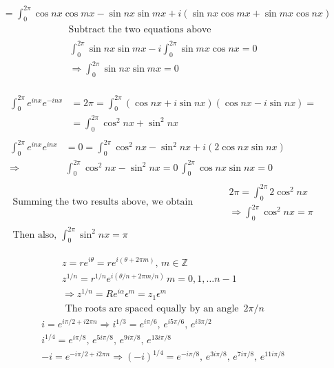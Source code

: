 \documentclass[twoside]{amsart}
\theoremstyle{plain}
\theoremstyle{definition}
\newcommand{\exercisehead}[1]
  {\smallskip
   \noindent{\small\bf Exercise #1.}}
\begin{document}
\begin{enumerate}
\[\begin{aligned}
      & = \int_0^{2\pi} \cos{nx}\cos{mx} -\sin{nx}\sin{mx} + i (\sin{nx}\cos{mx} + \sin{mx} \cos{nx} )  
    \end{aligned} 
\]
\[
\begin{gathered}
    \text{ Subtract the two equations above } \\  
    \begin{gathered}
      \int_0^{2\pi} \sin{nx}\sin{mx} -i \int_0^{2\pi} \sin{mx} \cos{nx} = 0 \\
      \Longrightarrow \int_0^{2\pi} \sin{nx}\sin{mx} = 0 
    \end{gathered}
\end{gathered}
\]

\[
\begin{gathered}
  \begin{aligned}
    \int_0^{2\pi} e^{inx}e^{-inx} & = 2\pi = \int_0^{2\pi} (\cos{nx} + i\sin{nx})(\cos{nx} - i \sin{nx}) = \\
    & = \int_0^{2\pi} \cos^2{nx} + \sin^2{nx} 
\end{aligned} \\
  \begin{aligned}
    \int_0^{2\pi} e^{inx}e^{inx} & = 0 = \int_0^{2\pi} \cos^2{nx} - \sin^2{nx} + i (2\cos{nx}\sin{nx}) \\
    \Longrightarrow & \int_0^{2\pi} \cos^2{nx} - \sin^2{nx} = 0 \, \int_0^{2\pi} \cos{nx}\sin{nx} = 0  
  \end{aligned} 
\end{gathered}
\]
\[
\begin{gathered}
  \text{ Summing the two results above, we obtain } \quad \quad \quad  
  \begin{gathered}
    2\pi = \int_0^{2\pi} 2 \cos^2{nx}  \\
    \Longrightarrow \int_0^{2\pi} \cos^2{nx} = \pi 
  \end{gathered} \\
\text{ Then also, } \int_0^{2\pi} \sin^2{nx} = \pi 
\end{gathered}
\]
\end{enumerate}

\exercisehead{8} 
\[
\begin{gathered}
  z = re^{i\theta} = re^{i(\theta + 2\pi m ) }, \, m \in \mathbb{Z} \\
  z^{1/n} = r^{1/n} e^{i(\theta/n + 2 \pi m/n) } \, m = 0, 1, \dots n-1  \\
  \Longrightarrow z^{1/n} = Re^{i \alpha}\epsilon^m = z_1 \epsilon^m \\
  \text{ The roots are spaced equally by an angle } \, 2\pi /n 
\end{gathered}
\]
\[
\begin{gathered}
  i = e^{ i \pi/2 + i2\pi n } \Longrightarrow i^{1/3} = e^{i\pi/6}, \, e^{i 5\pi/6}, \, e^{i 3\pi/2 } \\ 
  i^{1/4} = e^{i \pi/8 }, \, e^{5 i \pi /8 }, \, e^{9i \pi/8}, \, e^{13i \pi /8 } \\
  -i = e^{-i\pi/2 + i 2\pi n } \Longrightarrow (-i)^{1/4} = e^{-i\pi/8}, \, e^{3i\pi/8}, \, e^{7i \pi /8}, \, e^{11i \pi/8} 
\end{gathered}
\]
\end{document}
